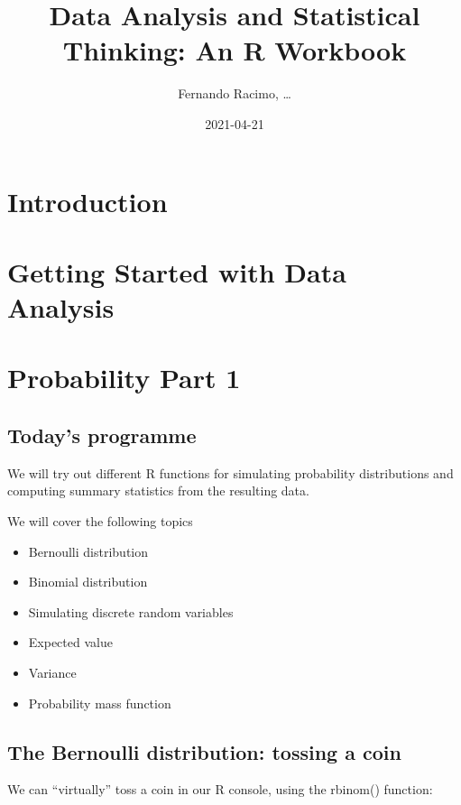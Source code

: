 \documentclass[
]{book}
\title{Data Analysis and Statistical Thinking: An R Workbook}
\author{Fernando Racimo, \ldots{}}
\date{2021-04-21}
\providecommand{\tightlist}{%
  \setlength{\itemsep}{0pt}\setlength{\parskip}{0pt}}
\begin{document}
\maketitle

{
\setcounter{tocdepth}{1}
\tableofcontents
}
\hypertarget{introduction}{%
\chapter{Introduction}\label{introduction}}

\hypertarget{intro}{%
\chapter{Getting Started with Data Analysis}\label{intro}}

\hypertarget{prob1}{%
\chapter{Probability Part 1}\label{prob1}}

\hypertarget{todays-programme}{%
\section{Today's programme}\label{todays-programme}}

We will try out different R functions for simulating probability distributions and computing summary statistics from the resulting data.

We will cover the following topics

\begin{itemize}
\tightlist
\item
  Bernoulli distribution
\item
  Binomial distribution
\item
  Simulating discrete random variables
\item
  Expected value
\item
  Variance
\item
  Probability mass function
\end{itemize}

\hypertarget{the-bernoulli-distribution-tossing-a-coin}{%
\section{The Bernoulli distribution: tossing a coin}\label{the-bernoulli-distribution-tossing-a-coin}}

We can ``virtually'' toss a coin in our R console, using the rbinom() function:
\end{document}
